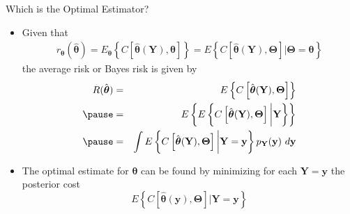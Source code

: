 \documentclass[t]{beamer}
\begin{document}
\begin{frame}{Which is the Optimal Estimator?}
  \footnotesize
  \begin{itemize}
    \item \pause Given that 
      \begin{eqnarray*}
        r_{\boldsymbol{\theta}}(\hat{\boldsymbol{\theta}}) = E_{\boldsymbol{\theta}} \left\{ C\left[\hat{\boldsymbol{\theta}}(\mathbf{Y}), \boldsymbol{\theta} \right]\right\}
        = E\left\{ C\left[ \hat{\boldsymbol{\theta}}(\mathbf{Y}), \boldsymbol{\Theta} \right]\bigg| \boldsymbol{\Theta} = \boldsymbol{\theta} \right\}
      \end{eqnarray*}
      \pause the average risk or Bayes risk is given by
      \begin{eqnarray*}
        R(\hat{\boldsymbol{\theta}}) & = & E\left\{ C\left[ \hat{\boldsymbol{\theta}}(\mathbf{Y}), \boldsymbol{\Theta} \right]\right\} \\ \pause
                                     & = & E\left\{E\left\{ C\left[ \hat{\boldsymbol{\theta}}(\mathbf{Y}), \boldsymbol{\Theta} \right] \bigg| \mathbf{Y}\right\} \right\} \\ \pause
                                     & = & \int E\left\{ C\left[ \hat{\boldsymbol{\theta}}(\mathbf{Y}), \boldsymbol{\Theta} \right] \bigg| \mathbf{Y} = \mathbf{y}\right\} p_{\mathbf{Y}}(\mathbf{y}) \ d\mathbf{y}
      \end{eqnarray*}
    \item \pause The optimal estimate for $\boldsymbol{\theta}$ can be found by minimizing for each $\mathbf{Y} = \mathbf{y}$ the posterior cost
      \begin{equation*}
        E\left\{ C\left[ \hat{\boldsymbol{\theta}}(\mathbf{y}), \boldsymbol{\Theta} \right] \bigg| \mathbf{Y} = \mathbf{y}\right\} 
      \end{equation*}
  \end{itemize}
  \normalsize
\end{frame}
\end{document}
